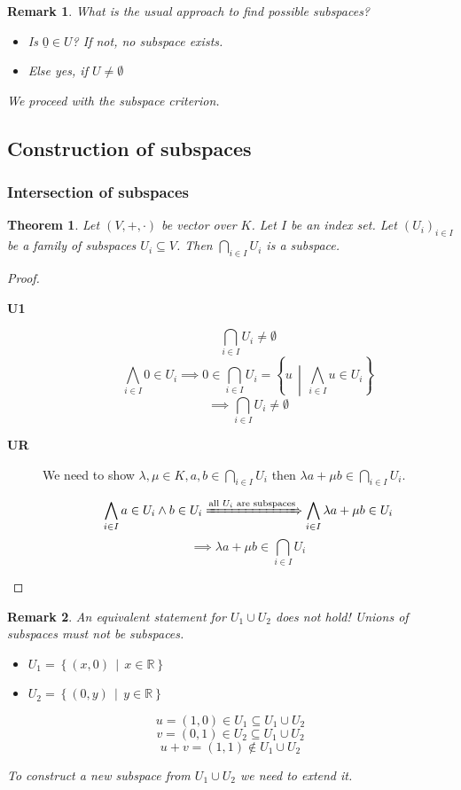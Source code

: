 \documentclass[a4paper,landscape,twocolumn]{article}
\newcommand\setdef[2]{\left\{#1\,\middle|\,#2\right\}}
\newtheorem{theorem}{Theorem}[section]
\newtheorem{rem}{Remark}[section]
\begin{document}
\begin{rem}
  What is the usual approach to find possible subspaces?
  \begin{itemize}
    \item Is $\underline{0} \in U$? If not, no subspace exists.
    \item Else yes, if $U \neq \emptyset$
  \end{itemize}
  We proceed with the subspace criterion.
\end{rem}

\subsection{Construction of subspaces}
\subsubsection{Intersection of subspaces}

\begin{theorem}
  \label{satz-3-6}
  Let $(V, +, \cdot)$ be vector over $K$. Let $I$ be an index set.
  Let $(U_i)_{i \in I}$ be a family of subspaces $U_i \subseteq V$.
  Then $\bigcap_{i \in I} U_i$ is a subspace.
\end{theorem}

\begin{proof}
  \begin{description}
    \item[\textbf{U1}]
      \[ \bigcap_{i \in I} U_i \neq \emptyset \]
      \[ \bigwedge_{i \in I} 0 \in U_i \implies 0 \in \bigcap_{i \in I} U_i = \setdef{u}{\bigwedge_{i \in I} u \in U_i} \]
      \[ \implies \bigcap_{i \in I} U_i \neq \emptyset \]
    \item[\textbf{UR}]
      We need to show $\lambda, \mu \in K, a, b \in \bigcap_{i \in I} U_i$
      then $\lambda a + \mu b \in \bigcap_{i \in I} U_i$.

      \[
          \bigwedge_{i \in I} a \in U_i \land b \in U_i
          \xRightarrow{\text{all } U_i \text{ are subspaces}}
          \bigwedge_{i \in I} \lambda a + \mu b \in U_i
      \]
      \[ \implies \lambda a + \mu b \in \bigcap_{i \in I} U_i \]
  \end{description}
\end{proof}

\begin{rem}
  An equivalent statement for $U_1 \cup U_2$ does not hold!
  Unions of subspaces must not be subspaces.

  \begin{itemize}
    \item $U_1 = \setdef{(x, 0)}{x \in \mathbb R}$
    \item $U_2 = \setdef{(0, y)}{y \in \mathbb R}$
  \end{itemize}

  \[ u = (1, 0) \in U_1 \subseteq U_1 \cup U_2 \]
  \[ v = (0, 1) \in U_2 \subseteq U_1 \cup U_2 \]
  \[ u + v = (1, 1) \not\in U_1 \cup U_2 \]

  To construct a new subspace from $U_1 \cup U_2$ we need to extend it.
\end{rem}
\end{document}
